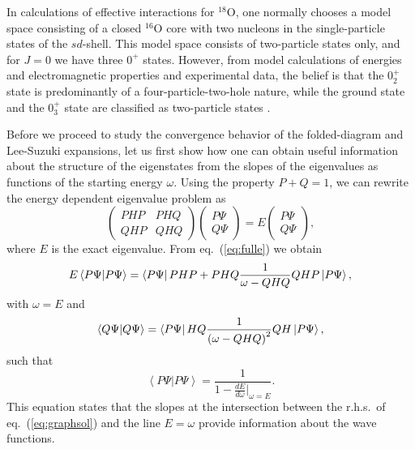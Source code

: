 In calculations of effective interactions for $^{18}$O,
one normally chooses a model space
consisting of a closed $^{16}$O core with two nucleons
in the single-particle states of the $sd$-shell.
This model space consists of two-particle states only,
and for $J=0$ we have
three $0^+$ states.
However, from model calculations of energies and
 electromagnetic properties and experimental
data, the belief is that the $0_2^+$ state is predominantly of a
four-particle-two-hole nature, while the ground
state and the $0_3^+$ state are classified as two-particle
states \cite{ee70}.


Before we proceed to study the convergence behavior of
the folded-diagram and Lee-Suzuki
expansions, let us first show how one can
obtain useful information about the structure of the
eigenstates from the slopes
of the eigenvalues as functions of the starting energy $\omega$.
Using the property $P+Q=1$, we can rewrite the energy dependent
eigenvalue problem as
\begin{equation}
     \left(\begin{array}{cc}PHP &PHQ\\QHP& QHQ\end{array}\right)
     \left(\begin{array}{c} P\Psi\\Q\Psi\end{array}\right)
     =E \left(\begin{array}{c}P\Psi\\Q\Psi\end{array}\right),
     \label{eq:fulle}
\end{equation}
where $E$ is the exact eigenvalue.
From eq.\ (\ref{eq:fulle}) we obtain
\begin{equation}
     E\left\langle P\Psi |  P\Psi\right\rangle =
     \left\langle P\Psi \right|PHP+PHQ\frac{1}{\omega - QHQ}QHP\left| P\Psi \right\rangle,
    \label{eq:graphsol}
\end{equation}
with $\omega=E$ and
\begin{equation}
     \left\langle Q\Psi | Q\Psi\right\rangle =
     \left\langle P\Psi \right|HQ\frac{1}{\left(\omega - QHQ\right)^2}QH\left| P\Psi \right\rangle,
\end{equation}
such that
\begin{equation}
    \left\langle P\Psi | P\Psi\right\rangle =
    \frac{1}{1-\frac{dE}{d\omega}|_{\omega=E}}.
\label{eq:overlap}
\end{equation}
This equation states that the slopes at the
intersection between the r.h.s.\ of eq.\ (\ref{eq:graphsol})
and the line $E=\omega$
provide information about the wave functions.
